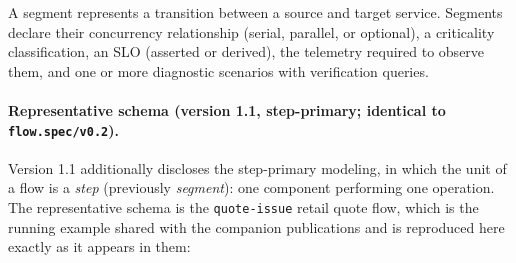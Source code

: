 \documentclass[11pt]{article}
\newcommand{\code}[1]{\texttt{#1}}
\begin{document}
A segment represents a transition between a source and target service. Segments declare their concurrency relationship (serial, parallel, or optional), a criticality classification, an SLO (asserted or derived), the telemetry required to observe them, and one or more diagnostic scenarios with verification queries.

\paragraph{Representative schema (version 1.1, step-primary; identical to \code{flow.spec/v0.2}).}

Version 1.1 additionally discloses the step-primary modeling, in which the unit of a flow is a \emph{step} (previously \emph{segment}): one component performing one operation. The representative schema is the \code{quote-issue} retail quote flow, which is the running example shared with the companion publications and is reproduced here exactly as it appears in them:
\end{document}
